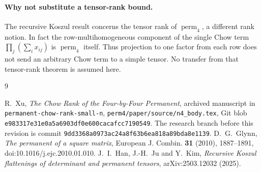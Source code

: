 \documentclass[11pt]{article}
\theoremstyle{remark}
\newcommand{\perm}{\operatorname{perm}}
\begin{document}
\paragraph{Why not substitute a tensor-rank bound.}
The recursive Koszul result \cite{hanjukim} concerns the tensor rank of
$\perm_4$, a different rank notion. In fact the row-multihomogeneous
component of the single Chow term
$\prod_j(\sum_i x_{ij})$ is $\perm_4$ itself. Thus projection to one
factor from each row does not send an arbitrary Chow term to a simple
tensor. No transfer from that tensor-rank theorem is assumed here.

\begin{thebibliography}{9}
\raggedright
{}
R.~Xu, \emph{The Chow Rank of the Four-by-Four Permanent},
archived manuscript in \texttt{permanent-chow-rank-small-n},
\texttt{perm4/paper/source/n4\_body.tex}, Git blob
\texttt{e983317e31e0a5a6903df0e600cacafcc7190549}.
The research branch before this revision is commit
\texttt{9dd3368a0973ac24a8f63b6ea818a89bda8e1139}.
D.~G.~Glynn, \emph{The permanent of a square matrix},
European J. Combin. \textbf{31} (2010), 1887--1891,
doi:10.1016/j.ejc.2010.01.010.
J.~I.~Han, J.-H.~Ju and Y.~Kim,
\emph{Recursive Koszul flattenings of determinant and permanent tensors},
arXiv:2503.12032 (2025).
\end{thebibliography}
\end{document}
